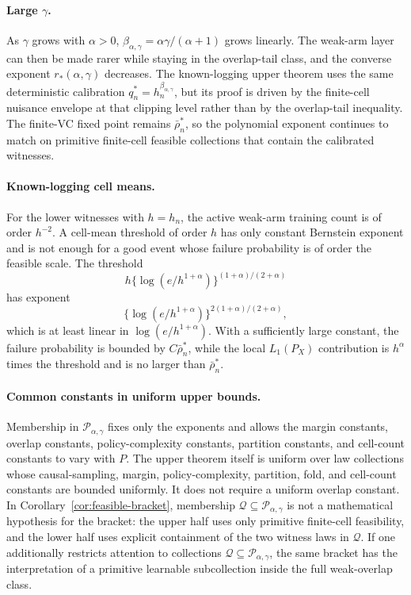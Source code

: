 \documentclass[11pt]{article}
\theoremstyle{definition}
\theoremstyle{plain}
\theoremstyle{remark}
\begin{document}
\paragraph{Large \(\gamma\).}
As \(\gamma\) grows with \(\alpha>0\),
\(\beta_{\alpha,\gamma}=\alpha\gamma/(\alpha+1)\) grows linearly.  The
weak-arm layer can then be made rarer while staying in the overlap-tail
class, and the converse exponent \(r_*(\alpha,\gamma)\) decreases.  The
known-logging upper theorem uses the same deterministic calibration
\(q_n^*=h_n^{\beta_{\alpha,\gamma}}\), but its proof is driven by the
finite-cell nuisance envelope at that clipping level rather than by the
overlap-tail inequality.  The finite-VC fixed point remains
\(\bar\rho_n^*\), so the polynomial exponent continues to match on primitive
finite-cell feasible collections that contain the calibrated witnesses.

\paragraph{Known-logging cell means.}
For the lower witnesses with \(h=h_n\), the active weak-arm training count is
of order \(h^{-2}\).  A cell-mean threshold of order \(h\) has only constant
Bernstein exponent and is not enough for a good event whose failure
probability is of order the feasible scale.  The threshold
\[
h\{\log(e/h^{1+\alpha})\}^{(1+\alpha)/(2+\alpha)}
\]
has exponent
\[
\{\log(e/h^{1+\alpha})\}^{2(1+\alpha)/(2+\alpha)},
\]
which is at least linear in \(\log(e/h^{1+\alpha})\).  With a sufficiently
large constant, the failure probability is bounded by \(C\bar\rho_n^*\),
while the local \(L_1(P_X)\) contribution is \(h^\alpha\) times the threshold
and is no larger than \(\bar\rho_n^*\).

\paragraph{Common constants in uniform upper bounds.}
Membership in \(\mathcal P_{\alpha,\gamma}\) fixes only the exponents and
allows the margin constants, overlap constants, policy-complexity constants,
partition constants, and cell-count constants to vary with \(P\).  The upper
theorem itself is uniform over law collections whose causal-sampling, margin,
policy-complexity, partition, fold, and cell-count constants are bounded
uniformly.  It does not require a uniform overlap constant.  In
Corollary~\ref{cor:feasible-bracket}, membership
\(\mathcal Q\subseteq\mathcal P_{\alpha,\gamma}\) is not a mathematical
hypothesis for the bracket: the upper half uses only primitive finite-cell
feasibility, and the lower half uses explicit containment of the two witness
laws in \(\mathcal Q\).  If one additionally restricts attention to
collections \(\mathcal Q\subseteq\mathcal P_{\alpha,\gamma}\), the same
bracket has the interpretation of a primitive learnable subcollection inside
the full weak-overlap class.
\end{document}
